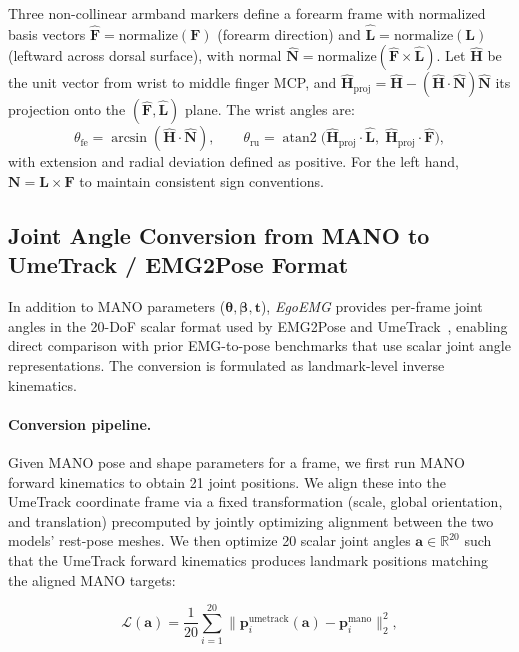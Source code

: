 \documentclass{article}
\newcommand{\dataset}{\textit{EgoEMG}}
\begin{document}
Three non-collinear armband markers define a forearm frame with normalized basis vectors
$\hat{\mathbf{F}} = \mathrm{normalize}(\mathbf{F})$ (forearm direction) and $\hat{\mathbf{L}} = \mathrm{normalize}(\mathbf{L})$ (leftward across dorsal
surface), with normal $\hat{\mathbf{N}} = \mathrm{normalize}(\hat{\mathbf{F}} \times
\hat{\mathbf{L}})$. Let $\hat{\mathbf{H}}$ be the unit vector from wrist to middle
finger MCP, and $\hat{\mathbf{H}}_{\text{proj}} = \hat{\mathbf{H}} - (\hat{\mathbf{H}} \cdot \hat{\mathbf{N}})\hat{\mathbf{N}}$ its projection onto the
$(\hat{\mathbf{F}},\hat{\mathbf{L}})$ plane. The wrist angles are:
\[
\theta_{\text{fe}} = \arcsin(\hat{\mathbf{H}} \cdot \hat{\mathbf{N}}), \qquad
\theta_{\text{ru}} = \operatorname{atan2}\bigl(\hat{\mathbf{H}}_{\text{proj}}
\cdot \hat{\mathbf{L}},\; \hat{\mathbf{H}}_{\text{proj}} \cdot
\hat{\mathbf{F}}\bigr),
\]
with extension and radial deviation defined as positive. For the left hand,
$\mathbf{N} = \mathbf{L} \times \mathbf{F}$ to maintain consistent sign
conventions.

\subsection{Joint Angle Conversion from MANO to UmeTrack / EMG2Pose Format}
\label{app:joint_angle_conversion}

In addition to MANO parameters ($\boldsymbol{\theta}, \boldsymbol{\beta}, \mathbf{t}$), \dataset{} provides per-frame joint angles in the 20-DoF scalar format used by EMG2Pose and UmeTrack~\citep{emg2pose, umetrack}, enabling direct comparison with prior EMG-to-pose benchmarks that use scalar joint angle representations. The conversion is formulated as landmark-level inverse kinematics.

\paragraph{Conversion pipeline.}
Given MANO pose and shape parameters for a frame, we first run MANO forward kinematics to obtain 21 joint positions. We align these into the UmeTrack coordinate frame via a fixed transformation (scale, global orientation, and translation) precomputed by jointly optimizing alignment between the two models' rest-pose meshes. We then optimize 20 scalar joint angles $\mathbf{a} \in \mathbb{R}^{20}$ such that the UmeTrack forward kinematics produces landmark positions matching the aligned MANO targets:

\begin{equation}
\mathcal{L}(\mathbf{a}) = \frac{1}{20} \sum_{i=1}^{20} \bigl\|\mathbf{p}_i^{\text{umetrack}}(\mathbf{a}) - \mathbf{p}_i^{\text{mano}}\bigr\|_2^2,
\end{equation}
\end{document}

